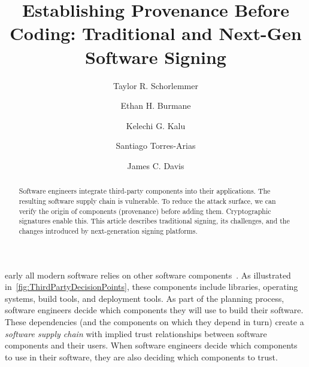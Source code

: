 \documentclass{IEEEcsmagTechrxiv}
\begin{document}
\ifTECHRXIV
\else
\fi

\title{Establishing Provenance Before Coding: Traditional and Next-Gen Software Signing}

\author{Taylor R. Schorlemmer}

\author{Ethan H. Burmane}

\author{Kelechi G. Kalu}

\author{Santiago Torres-Arias}

\author{James C. Davis}

\ifTECHRXIV
\else
\fi

\begin{abstract}
	Software engineers integrate third-party components into their applications.
	The resulting software supply chain is vulnerable.
	To reduce the attack surface, we can verify the origin of components (provenance) before adding them.
    Cryptographic signatures enable this.
    This article describes traditional signing, its challenges, and the changes introduced by next-generation signing platforms.
    
\end{abstract}


\maketitle


early all modern software relies on other software components~\cite{Sonatype2024}.
As illustrated in~\cref{fig:ThirdPartyDecisionPoints}, these components include libraries, operating systems, build tools, and deployment tools.
As part of the planning process, software engineers decide which components they will use to build their software.
These dependencies (and the components on which they depend in turn) create a \textit{software supply chain} with implied trust relationships between software components and their users.
When software engineers decide which components to use in their software, they are also deciding which components to trust.
\end{document}
